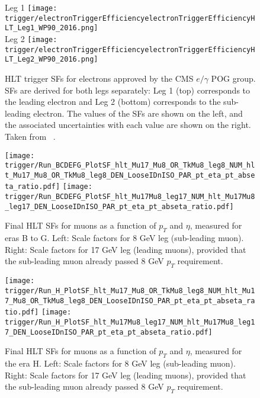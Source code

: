 \begin{figure}[H]
\centering
\subfloat Leg 1
{\texttt{[image: trigger/electronTriggerEfficiencyelectronTriggerEfficiencyHLT\_Leg1\_WP90\_2016.png]} } \\
\subfloat Leg 2
{\texttt{[image: trigger/electronTriggerEfficiencyelectronTriggerEfficiencyHLT\_Leg2\_WP90\_2016.png]} } \\
\caption[HLT trigger SFs for electrons.]{HLT trigger SFs for electrons approved by the CMS $e/ \gamma$ POG group.  SFs are derived for both legs separately: Leg 1 (top) corresponds to the leading electron and Leg 2 (bottom) corresponds to the sub-leading electron. The values of the SFs are shown on the left, and the associated uncertainties with each value are shown on the right. Taken from ~\cite{vhbbAN}.}
\label{fig:trigger_eff_diele}
\end{figure}


\begin{figure}[H]
\centering
\texttt{[image: trigger/Run\_BCDEFG\_PlotSF\_hlt\_Mu17\_Mu8\_OR\_TkMu8\_leg8\_NUM\_hlt\_Mu17\_Mu8\_OR\_TkMu8\_leg8\_DEN\_LooseIDnISO\_PAR\_pt\_eta\_pt\_abseta\_ratio.pdf]}
\texttt{[image: trigger/Run\_BCDEFG\_PlotSF\_hlt\_Mu17Mu8\_leg17\_NUM\_hlt\_Mu17Mu8\_leg17\_DEN\_LooseIDnISO\_PAR\_pt\_eta\_pt\_abseta\_ratio.pdf]}\\
\caption[Final HLT SFs for muons as a function of $p_{T}$ and $\eta$, measured for eras B to G.]{Final HLT SFs for muons as a function of $p_{T}$ and $\eta$, measured for eras B to G. Left: Scale factors for 8 GeV leg (sub-leading muon). Right: Scale factors for 17 GeV leg (leading muons), provided that the sub-leading muon already passed 8 GeV $p_T$ requirement.}
\label{fig:trigger_SF_dimu_BCDEFG}
\end{figure}

\begin{figure}[H]
\centering
\texttt{[image: trigger/Run\_H\_PlotSF\_hlt\_Mu17\_Mu8\_OR\_TkMu8\_leg8\_NUM\_hlt\_Mu17\_Mu8\_OR\_TkMu8\_leg8\_DEN\_LooseIDnISO\_PAR\_pt\_eta\_pt\_abseta\_ratio.pdf]}
\texttt{[image: trigger/Run\_H\_PlotSF\_hlt\_Mu17Mu8\_leg17\_NUM\_hlt\_Mu17Mu8\_leg17\_DEN\_LooseIDnISO\_PAR\_pt\_eta\_pt\_abseta\_ratio.pdf]}\\
\caption[Final HLT SFs for muons as a function of $p_{T}$ and $\eta$, measured for the era H.]{Final HLT SFs for muons as a function of $p_{T}$ and $\eta$, measured for the era H. Left: Scale factors for 8 GeV leg (sub-leading muon). Right: Scale factors for 17 GeV leg (leading muons), provided that the sub-leading muon already passed 8 GeV $p_T$ requirement.}
\label{fig:trigger_SF_dimu_H}
\end{figure}

